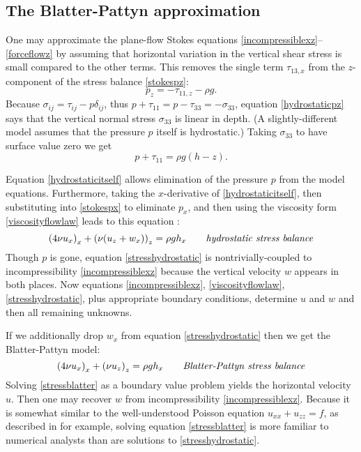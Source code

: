 \documentclass[letterpaper,final,12pt,reqno]{amsart}
\begin{document}
\subsection*{The Blatter-Pattyn approximation}  One may approximate the plane-flow Stokes equations \eqref{incompressiblexz}--\eqref{forceflowz} by assuming that horizontal variation in the vertical shear stress is small compared to the other terms.  This removes the single term  $\tau_{13,x}$ from the $z$-component of the stress balance \eqref{stokespz}:
\begin{equation}
p_z = - \tau_{11,z} - \rho g. \label{hydrostaticpz}
\end{equation}
Because $\sigma_{ij} = \tau_{ij} - p \delta_{ij}$, thus $p + \tau_{11} = p - \tau_{33} = - \sigma_{33}$, equation \eqref{hydrostaticpz} says that the vertical normal stress $\sigma_{33}$ is linear in depth.  (A slightly-different model assumes that the pressure $p$ itself is hydrostatic.)  Taking $\sigma_{33}$ to have surface value zero we get
\begin{equation}
p + \tau_{11} = \rho g (h-z). \label{hydrostaticitself}
\end{equation}

Equation \eqref{hydrostaticitself} allows elimination of the pressure $p$ from the model equations.  Furthermore, taking the $x$-derivative of \eqref{hydrostaticitself}, then substituting into \eqref{stokespx} to eliminate $p_x$, and then using the viscosity form \eqref{viscosityflowlaw} leads to this equation \cite{GreveBlatter2009}:
\begin{equation}
\left(4 \nu u_x\right)_x + \left(\nu (u_z+w_x)\right)_z = \rho g h_x \qquad\text{\emph{hydrostatic stress balance}} \label{stresshydrostatic}
\end{equation}
Though $p$ is gone, equation \eqref{stresshydrostatic} is nontrivially-coupled to incompressibility \eqref{incompressiblexz} because the vertical velocity $w$ appears in both places.  Now equations \eqref{incompressiblexz}, \eqref{viscosityflowlaw}, \eqref{stresshydrostatic}, plus appropriate boundary conditions, determine $u$ and $w$ and then all remaining unknowns.

If we additionally drop $w_x$ from equation \eqref{stresshydrostatic} then we get the Blatter-Pattyn model:
\begin{equation}
\left(4 \nu u_x\right)_x + \left(\nu u_z\right)_z = \rho g h_x \qquad\text{\emph{Blatter-Pattyn stress balance}} \label{stressblatter}
\end{equation}
Solving \eqref{stressblatter} as a boundary value problem yields the horizontal velocity $u$.  Then one may recover $w$ from incompressibility \eqref{incompressiblexz}.  Because it is somewhat similar to the well-understood Poisson equation $u_{xx} + u_{zz} = f$, as described in \cite{LeVequeFD,MortonMayers} for example, solving equation \eqref{stressblatter} is more familiar to numerical analysts than are solutions to \eqref{stresshydrostatic}.
\end{document}
